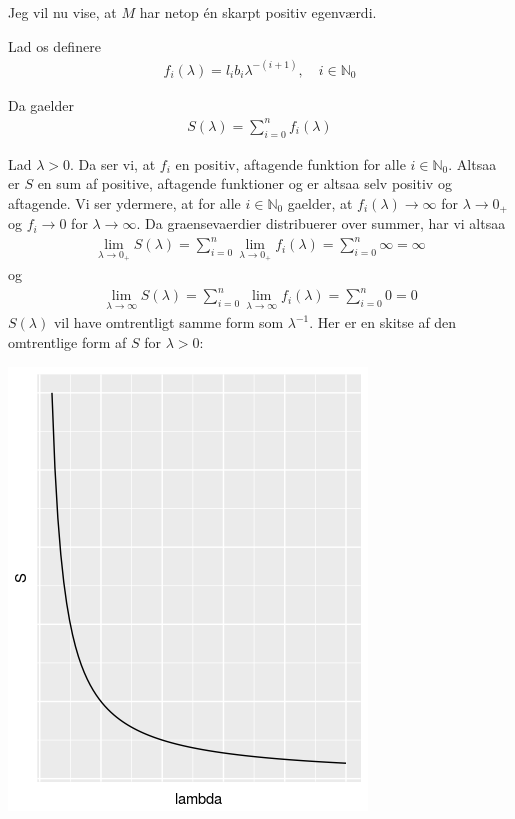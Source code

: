 \documentclass[12pt]{article}
\begin{document}
Jeg vil nu vise, at $M$ har netop én skarpt positiv egenværdi. 

Lad os definere 
\begin{align}
f_i(\lambda) = l_ib_i\lambda^{-(i+1)}, \quad i\in\mathbb{N}_0
\end{align}

Da gaelder
\begin{align}
S(\lambda) = \sum_{i=0}^n f_i(\lambda)
\end{align}

Lad $\lambda>0$. Da ser vi, at $f_i$ en positiv, aftagende funktion for alle $i\in \mathbb{N}_0$. Altsaa er $S$ en sum af positive, aftagende funktioner og er altsaa selv positiv og aftagende. Vi ser ydermere, at for alle $i \in \mathbb{N}_0$ gaelder, at $f_i(\lambda) \to \infty$ for $\lambda \to 0_+$ og $f_i \to 0$ for $\lambda \to \infty$. Da graensevaerdier distribuerer over summer, har vi altsaa 
\begin{align}
\lim_{\lambda \to 0_+} S(\lambda) = \sum_{i=0}^n \lim_{\lambda \to 0_+} f_i(\lambda) =  \sum_{i=0}^n \infty = \infty 
\end{align}
og
\begin{align}
\lim_{\lambda \to \infty} S(\lambda) = \sum_{i=0}^n \lim_{\lambda \to \infty} f_i(\lambda) =  \sum_{i=0}^n 0 = 0
\end{align}
$S(\lambda)$ vil have omtrentligt samme form som $\lambda^{-1}$. Her er en skitse af den omtrentlige form af $S$ for $\lambda>0$:
\begin{center}
\includegraphics[scale=0.5]{q2Splt.png}
\end{center}
\end{document}
